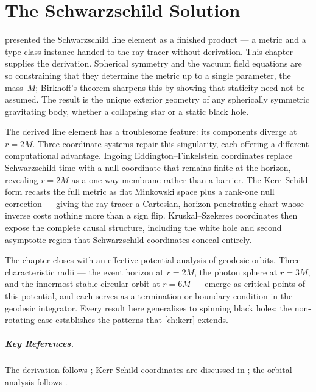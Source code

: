 \chapter{The Schwarzschild Solution}
\label{ch:schwarzschild}

 presented the Schwarzschild line element as a
finished product --- a metric and a type class instance handed to the ray
tracer without derivation.  This chapter supplies the derivation.  Spherical
symmetry and the vacuum field equations are so constraining that they
determine the metric up to a single parameter, the mass~$M$; Birkhoff's
theorem sharpens this by showing that staticity need not be assumed.  The
result is the unique exterior geometry of any spherically symmetric
gravitating body, whether a collapsing star or a static black hole.

The derived line element has a troublesome feature: its components diverge at
$r = 2M$.  Three coordinate systems repair this singularity, each offering a
different computational advantage.  Ingoing Eddington--Finkelstein coordinates
replace Schwarzschild time with a null coordinate that remains finite at the
horizon, revealing $r = 2M$ as a one-way membrane rather than a barrier.  The
Kerr--Schild form recasts the full metric as flat Minkowski space plus a
rank-one null correction --- giving the ray tracer a Cartesian,
horizon-penetrating chart whose inverse costs nothing more than a sign flip.
Kruskal--Szekeres coordinates then expose the complete causal structure,
including the white hole and second asymptotic region that Schwarzschild
coordinates conceal entirely.

The chapter closes with an effective-potential analysis of geodesic orbits.
Three characteristic radii --- the event horizon at $r = 2M$, the photon
sphere at $r = 3M$, and the innermost stable circular orbit at $r = 6M$ ---
emerge as critical points of this potential, and each serves as a termination
or boundary condition in the geodesic integrator.  Every result here
generalises to spinning black holes; the non-rotating case establishes the
patterns that \cref{ch:kerr} extends.











\paragraph{Key References.}
The derivation follows \cite{Carroll2004}; Kerr-Schild coordinates are
discussed in \cite{Visser2007}; the orbital analysis follows \cite{Wald1984}.
